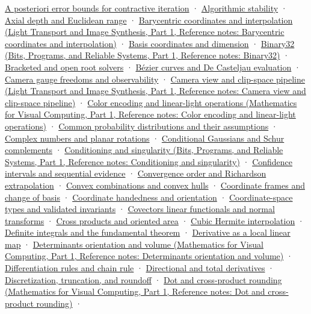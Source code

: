 \hyperref[appendix-d83b0ad1be7f]{A posteriori error bounds for contractive iteration} · \hyperref[appendix-aa2bf0d79639]{Algorithmic stability} · \hyperref[appendix-cac01ebeeb11]{Axial depth and Euclidean range} · \href{../04-Light-Transport-and-Image-Synthesis-P01/main.pdf\#appendix-02b9d9a81dca}{Barycentric coordinates and interpolation (Light Transport and Image Synthesis, Part 1, Reference notes: Barycentric coordinates and interpolation)} · \hyperref[appendix-ce0341f7ea0d]{Basis coordinates and dimension} · \href{../01-Bits-Programs-and-Reliable-Systems-P01/main.pdf\#appendix-5057f9ad327f}{Binary32 (Bits, Programs, and Reliable Systems, Part 1, Reference notes: Binary32)} · \hyperref[appendix-f63eb850796d]{Bracketed and open root solvers} · \hyperref[appendix-ddbec701898c]{Bézier curves and De Casteljau evaluation} · \hyperref[appendix-113f0267e5f4]{Camera gauge freedoms and observability} · \href{../04-Light-Transport-and-Image-Synthesis-P01/main.pdf\#appendix-1c07d64f5e70}{Camera view and clip-space pipeline (Light Transport and Image Synthesis, Part 1, Reference notes: Camera view and clip-space pipeline)} · \href{../02-Mathematics-for-Visual-Computing-P01/main.pdf\#appendix-a9f83ad40792}{Color encoding and linear-light operations (Mathematics for Visual Computing, Part 1, Reference notes: Color encoding and linear-light operations)} · \hyperref[appendix-a2360b435383]{Common probability distributions and their assumptions} · \hyperref[appendix-f77eadcc4a93]{Complex numbers and planar rotations} · \hyperref[appendix-f0437ea55a47]{Conditional Gaussians and Schur complements} · \href{../01-Bits-Programs-and-Reliable-Systems-P01/main.pdf\#appendix-8f6a01f284a7}{Conditioning and singularity (Bits, Programs, and Reliable Systems, Part 1, Reference notes: Conditioning and singularity)} · \hyperref[appendix-c83016554b1e]{Confidence intervals and sequential evidence} · \hyperref[appendix-aca80b6bf17a]{Convergence order and Richardson extrapolation} · \hyperref[appendix-0026ec42c9d5]{Convex combinations and convex hulls} · \hyperref[appendix-1bae9457dbc3]{Coordinate frames and change of basis} · \hyperref[appendix-87d7626c8d37]{Coordinate handedness and orientation} · \hyperref[appendix-380a220e2529]{Coordinate-space types and validated invariants} · \hyperref[appendix-46da295c6787]{Covectors linear functionals and normal transforms} · \hyperref[appendix-2391db8052b1]{Cross products and oriented area} · \hyperref[appendix-db3aef8f2fd6]{Cubic Hermite interpolation} · \hyperref[appendix-1a50e72435c2]{Definite integrals and the fundamental theorem} · \hyperref[appendix-7bc181935c42]{Derivative as a local linear map} · \href{../02-Mathematics-for-Visual-Computing-P01/main.pdf\#appendix-da478be01d02}{Determinants orientation and volume (Mathematics for Visual Computing, Part 1, Reference notes: Determinants orientation and volume)} · \hyperref[appendix-d9f70bdfbc92]{Differentiation rules and chain rule} · \hyperref[appendix-e2d476574aab]{Directional and total derivatives} · \hyperref[appendix-6b0648b2b8e8]{Discretization, truncation, and roundoff} · \href{../02-Mathematics-for-Visual-Computing-P01/main.pdf\#appendix-5aef4f13483a}{Dot and cross-product rounding (Mathematics for Visual Computing, Part 1, Reference notes: Dot and cross-product rounding)} · 